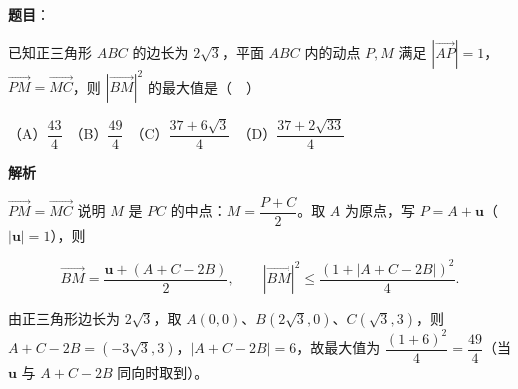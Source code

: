 \begin{answer}

\textbf{题目}：

已知正三角形 \(ABC\) 的边长为 \(2\sqrt{3}\)，平面 \(ABC\) 内的动点 \(P,M\) 满足 \(\left|\overrightarrow{AP}\right|=1\)，\(\overrightarrow{PM}=\overrightarrow{MC}\)，则 \(\left|\overrightarrow{BM}\right|^{2}\) 的最大值是（　）

（A）\(\dfrac{43}{4}\)　（B）\(\dfrac{49}{4}\)　（C）\(\dfrac{37+6\sqrt{3}}{4}\)　（D）\(\dfrac{37+2\sqrt{33}}{4}\)

\textbf{解析}

\(\overrightarrow{PM}=\overrightarrow{MC}\) 说明 \(M\) 是 \(PC\) 的中点：\(M=\dfrac{P+C}{2}\)。取 \(A\) 为原点，写 \(P=A+\boldsymbol u\)（\(|\boldsymbol u|=1\)），则

\nopagebreak[4]
\[
\overrightarrow{BM}=\frac{\boldsymbol u+(A+C-2B)}{2},\qquad
\left|\overrightarrow{BM}\right|^{2}\leqslant\frac{(1+|A+C-2B|)^{2}}{4}.
\]

由正三角形边长为 \(2\sqrt{3}\)，取 \(A(0,0)\)、\(B(2\sqrt{3},0)\)、\(C(\sqrt{3},3)\)，则 \(A+C-2B=(-3\sqrt{3},3)\)，\(|A+C-2B|=6\)，故最大值为 \(\dfrac{(1+6)^{2}}{4}=\dfrac{49}{4}\)（当 \(\boldsymbol u\) 与 \(A+C-2B\) 同向时取到）。


\end{answer}

